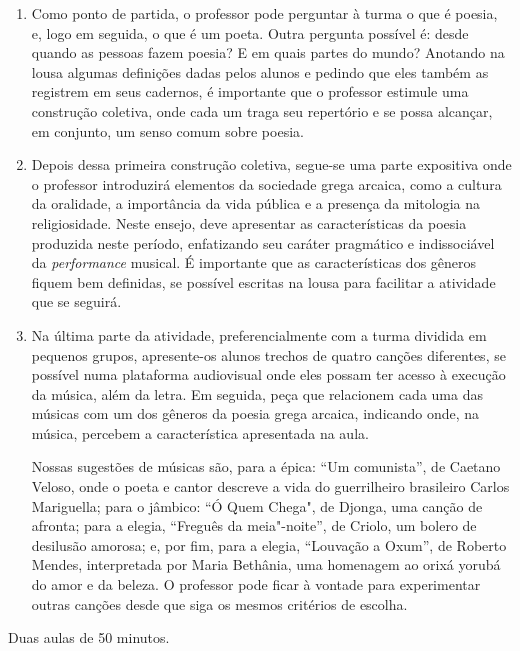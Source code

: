 \documentclass[12pt]{extarticle}
\begin{document}
\begin{enumerate}
\item
Como ponto de partida, o professor pode perguntar à turma o que é poesia,
e, logo em seguida, o que é um poeta. Outra pergunta possível é: desde quando
as pessoas fazem poesia? E em quais partes do mundo? 
Anotando na lousa algumas definições dadas pelos alunos e pedindo que eles
também as registrem em seus cadernos, é importante que o professor estimule 
uma construção coletiva, onde cada um traga seu repertório e se possa alcançar,
em conjunto, um senso comum sobre poesia.

\item
Depois dessa primeira construção coletiva, segue-se uma parte expositiva onde 
o professor introduzirá elementos da sociedade grega arcaica, como a cultura
da oralidade, a importância da vida pública e a presença da mitologia na religiosidade. 
Neste ensejo, deve apresentar as características da poesia produzida neste período, 
enfatizando seu caráter pragmático e indissociável da \textit{performance} musical.
É importante que as características dos gêneros fiquem bem definidas, se possível
escritas na lousa para facilitar a atividade que se seguirá. 

\item
Na última parte da atividade, preferencialmente com a turma dividida em pequenos 
grupos, apresente-os alunos trechos de quatro canções diferentes, se possível numa 
plataforma audiovisual onde eles possam ter acesso à execução da música, além da letra. 
Em seguida, peça que relacionem cada uma das músicas com um dos gêneros da poesia grega 
arcaica, indicando onde, na música, percebem a característica apresentada na aula. 

Nossas sugestões de músicas são, para a épica: ``Um comunista'', de Caetano Veloso, 
onde o poeta e cantor descreve a vida do guerrilheiro brasileiro Carlos Mariguella;
para o jâmbico: ``Ó Quem Chega", de Djonga, uma canção de afronta; para a elegia, 
``Freguês da meia"-noite'', de Criolo, um bolero de desilusão amorosa; e, por fim,
para a elegia, ``Louvação a Oxum'', de Roberto Mendes, interpretada por Maria Bethânia,
uma homenagem ao orixá yorubá do amor e da beleza.
O professor pode ficar à vontade para experimentar outras canções desde que siga os
mesmos critérios de escolha.  

\end{enumerate}

 Duas aulas de 50 minutos. 
\end{document}
